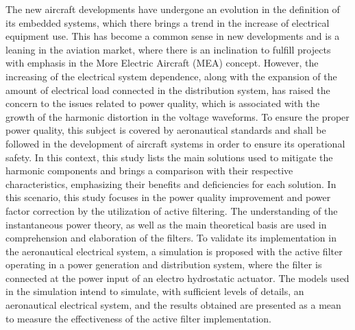 The new aircraft developments have undergone an evolution in the definition of its embedded systems, which there brings a trend in the increase of electrical equipment use. This has become a common sense in new developments and is a leaning in the aviation market, where there is an inclination to fulfill projects with emphasis in the More Electric Aircraft (MEA) concept. However, the increasing of the electrical system dependence, along with the expansion of the amount of electrical load connected in the distribution system, has raised the concern to the issues related to power quality, which is associated with the growth of the harmonic distortion in the voltage waveforms. To ensure the proper power quality, this subject is covered by aeronautical standards and shall be followed in the development of aircraft systems in order to ensure its operational safety. In this context, this study lists the main solutions used to mitigate the harmonic components and brings a comparison with their respective characteristics, emphasizing their benefits and deficiencies for each solution. In this scenario, this study focuses in the power quality improvement and power factor correction by the utilization of active filtering. The understanding of the instantaneous power theory, as well as the main theoretical basis are used in comprehension and elaboration of the filters. To validate its implementation in the aeronautical electrical system, a simulation is proposed with the active filter operating in a power generation and distribution system, where the filter is connected at the power input of an electro hydrostatic actuator. The models used in the simulation intend to simulate, with sufficient levels of details, an aeronautical electrical system, and the results obtained are presented as a mean to measure the effectiveness of the active filter implementation.